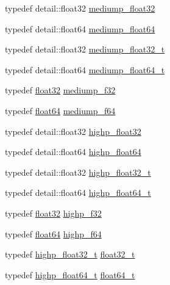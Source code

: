 \begin{DoxyCompactItemize}
\item 
typedef detail\+::float32 \hyperlink{group__gtc__type__precision_ga1b5f74cbeed0c9d42cd57d77609be7ee}{mediump\+\_\+float32}
\item 
typedef detail\+::float64 \hyperlink{group__gtc__type__precision_ga9225ae6aed0f90b6eb65bf8d466199c1}{mediump\+\_\+float64}
\item 
typedef detail\+::float32 \hyperlink{group__gtc__type__precision_gacbd406715148db96c9d9d2a2ef6460de}{mediump\+\_\+float32\+\_\+t}
\item 
typedef detail\+::float64 \hyperlink{group__gtc__type__precision_ga97a0747b103eb5ef320a91888de52f51}{mediump\+\_\+float64\+\_\+t}
\item 
typedef \hyperlink{group__gtc__type__precision_ga814f2f65354b6588b067cc5c67a6b340}{float32} \hyperlink{group__gtc__type__precision_ga3dbba6bd06a546d7a11d1c09c2f04b1a}{mediump\+\_\+f32}
\item 
typedef \hyperlink{group__gtc__type__precision_gab721f828b41f46b20cf4883b50733d3b}{float64} \hyperlink{group__gtc__type__precision_gabd273bd38ea5e013aeec9ffd2b2591fb}{mediump\+\_\+f64}
\item 
typedef detail\+::float32 \hyperlink{group__gtc__type__precision_ga91af7513c1102410646f2c435ca29be5}{highp\+\_\+float32}
\item 
typedef detail\+::float64 \hyperlink{group__gtc__type__precision_gab871a78c548d2fa53e1e8ec64a46eee7}{highp\+\_\+float64}
\item 
typedef detail\+::float32 \hyperlink{group__gtc__type__precision_ga4e16a7818d09e2da3b81765999f23928}{highp\+\_\+float32\+\_\+t}
\item 
typedef detail\+::float64 \hyperlink{group__gtc__type__precision_gae8b3b2ace5be2a61c6bf63f12643fa15}{highp\+\_\+float64\+\_\+t}
\item 
typedef \hyperlink{group__gtc__type__precision_ga814f2f65354b6588b067cc5c67a6b340}{float32} \hyperlink{group__gtc__type__precision_ga48d80b6fd3a40b71b2e414493832d1ca}{highp\+\_\+f32}
\item 
typedef \hyperlink{group__gtc__type__precision_gab721f828b41f46b20cf4883b50733d3b}{float64} \hyperlink{group__gtc__type__precision_gab1306a5a8ae99fb2867b548b1546bbe0}{highp\+\_\+f64}
\item 
typedef \hyperlink{group__gtc__type__precision_ga4e16a7818d09e2da3b81765999f23928}{highp\+\_\+float32\+\_\+t} \hyperlink{group__gtc__type__precision_ga642737ae3e7c434b366f2191e6944bf2}{float32\+\_\+t}
\item 
typedef \hyperlink{group__gtc__type__precision_gae8b3b2ace5be2a61c6bf63f12643fa15}{highp\+\_\+float64\+\_\+t} \hyperlink{group__gtc__type__precision_gade966a3eb25ebeb16dd53c40d3fdeb46}{float64\+\_\+t}

\end{DoxyCompactItemize}
